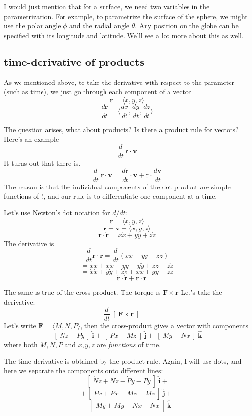 \documentclass[11pt, oneside]{article}
\begin{document}
I would just mention that for a surface, we need two variables in the parametrization.  For example, to parametrize the surface of the sphere, we might use the polar angle $\phi$ and the radial angle $\theta$.  Any position on the globe can be specified with its longitude and latitude.  We'll see a lot more about this as well.

\subsection*{time-derivative of products}
As we mentioned above, to take the derivative with respect to the parameter (such as time), we just go through each component of a vector
\[ \mathbf{r} = \langle x, y, z \rangle \]
\[ \frac{d \mathbf{r}}{dt} =  \langle \frac{dx}{dt}, \frac{dy}{dt}, \frac{dz}{dt} \rangle \]

The question arises, what about products?  Is there a product rule for vectors?  Here's an example
\[ \frac{d}{dt} \ \mathbf{r} \cdot \mathbf{v} \]
It turns out that there is.
\[ \frac{d}{dt} \ \mathbf{r} \cdot \mathbf{v} = \frac{d \mathbf{r}}{dt} \cdot \mathbf{v} + \mathbf{r} \cdot \frac{d \mathbf{v}}{dt}  \]
The reason is that the individual components of the dot product are simple functions of $t$, and our rule is to differentiate one component at a time.

Let's use Newton's dot notation for $d/dt$:
\[ \mathbf{r} = \langle x, y, z\rangle \]
\[ \mathbf{\dot{r}} = \mathbf{v} = \langle \dot{x}, \dot{y}, \dot{z} \rangle \]
\[ \mathbf{r} \cdot \mathbf{\dot{r}}  = x \dot{x} + y \dot{y} + z \dot{z} \]
The derivative is
\[ \frac{d}{dt} \mathbf{r} \cdot \mathbf{\dot{r}}  = \frac{d}{dt} ( x \dot{x} + y \dot{y} + z \dot{z} ) \]
\[ = \dot{x} \dot{x} + x \ddot{x} + \dot{y} \dot{y} + y \ddot{y} + \dot{z} \dot{z} + z \ddot{z}  \]
\[ = \dot{x} \dot{x} + \dot{y} \dot{y} + \dot{z} \dot{z} + x \ddot{x}  + y \ddot{y} + z \ddot{z}  \]
\[ =  \mathbf{\dot{r}} \cdot \mathbf{\dot{r}} +  \mathbf{r} \cdot \mathbf{\ddot{r}} \]

The same is true of the cross-product.  The torque is $\mathbf{F} \times \mathbf{r}$  Let's take the derivative:
\[ \frac{d}{dt} \ [ \ \mathbf{F} \times \mathbf{r} \ ] \ = \]
Let's write $\mathbf{F} = \langle M,N,P \rangle$, then the cross-product gives a vector with components
\[ \ [ \ N z - P y \ ] \ \mathbf{\hat{i}} + \ [ \ P x - M z \ ] \ \mathbf{\hat{j}} + \ [ \ M y - N x \ ] \ \mathbf{\hat{k}} \]
where both $M,N,P$ and $x,y,z$ are \emph{functions} of time.

The time derivative is obtained by the product rule.  Again, I will use dots, and here we separate the components onto different lines:
\[ \ [ \ \dot{N} z + N \dot{z} - \dot{P} y - P \dot{y} \ ] \ \mathbf{\hat{i}} + \]
\[ + \  [ \ \dot{P} x + P \dot{x} - \dot{M} z - M \dot{z} \ ] \ \mathbf{\hat{j}} + \]
\[ +  \ [ \ \dot{M} y + M \dot{y} - \dot{N} x - N \dot{x} \ ] \ \mathbf{\hat{k}} \]
\end{document}
